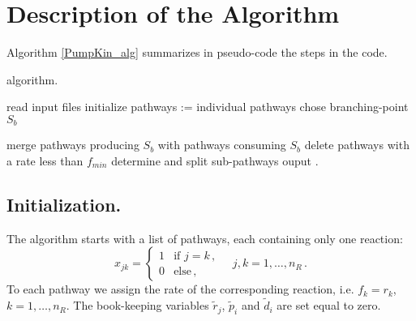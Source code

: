 
\section{Description of the Algorithm}
\label{sec2c}
Algorithm \ref{PumpKin_alg} summarizes in pseudo-code the steps in the \pump{} code.

\begin{algorithm}
\caption{\pump{} algorithm.}\label{PumpKin_alg}
\begin{algorithmic}[1]
\Begin
\State read input files 
\State initialize pathways := individual pathways 
\State chose branching-point $S_b$ 
\Repeat

	\State merge pathways producing $S_b$ with pathways consuming $S_b$ 
	\State delete pathways with a rate less than $f_{min}$ 
	\State determine and split sub-pathways 
\State ouput 
\End.
\end{algorithmic}
\end{algorithm}


\subsection{Initialization.}
\label{sec2c1}
The algorithm starts with a list of pathways, each containing only one reaction:
\begin{equation}
x_{jk} = \left\{\begin{array}{cc}1 & \textrm{if } j=k\,, \\0 & \textrm{else}\,, \end{array}\right.\quad  j,k = 1, \ldots , n_R\,. 
\label{2.4.0}
\end{equation}
To each pathway we assign the rate of the corresponding reaction, i.e. $f_k = r_k$, $k = 1,\ldots, n_R$. The book-keeping variables $\tilde{r}_j$, $\tilde{p}_i$ and $\tilde{d}_i$ are set equal to zero.



